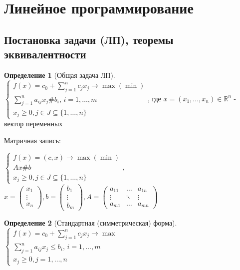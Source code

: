 \documentclass[a4paper]{article}
\theoremstyle{definition}
\newtheorem*{definition}{Определение}
\theoremstyle{remark}
\begin{document}
\section{Линейное программирование}
\subsection{Постановка задачи (ЛП), теоремы эквивалентности}
\begin{definition}[Общая задача ЛП]
$    \begin{cases}
        f(x) = c_0 + \sum_{j = 1}^n c_j x_j \to \max (\min) \\ 
        \sum_{j = 1}^{n} a_{ij}x_j \# b_i, \, i = 1, \dots, m \\
        x_j \geq 0, j \in J\subseteq \{1, \dots, n\}
    \end{cases}$, где \(x = (x_1, ..., x_n)\in \mathbb{R}^n\) -  вектор переменных

    Матричная запись:

    $\begin{cases}
        f(x) = (c, x) \to \max(\min)\\
        Ax \# b \\
        x_j \geq 0, j \in J\subseteq \{1, \dots, n\}
    \end{cases}$, $x = \begin{pmatrix}
        x_1 \\ \vdots \\ x_n
        \end{pmatrix}, b = \begin{pmatrix}
            b_1 \\ \vdots \\ b_m
            \end{pmatrix}, 
            A = \begin{pmatrix} 
                a_{11} & \dots  & a_{1n}\\
    \vdots & \ddots & \vdots\\
    a_{m1} & \dots  & a_{mn} 
    \end{pmatrix}$
\end{definition}
\begin{definition}[Стандартная (симметрическая) форма]
    $\begin{cases}
        f(x) = c_0 + \sum_{j = 1}^n c_j x_j \to \max \\
        \sum_{j = 1}^{n} a_{ij}x_j \leq b_i, \, i = 1, \dots, m \\ 
        x_j \geq 0, j = 1, \dots, n
    \end{cases}$
\end{definition}
\end{document}

